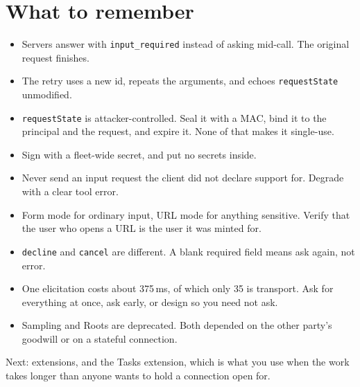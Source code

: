 \section{What to remember}

\begin{itemize}[leftmargin=1.6em, itemsep=3pt]
\item Servers answer with \texttt{input\_required} instead of asking mid-call.
The original request finishes.
\item The retry uses a new id, repeats the arguments, and echoes
\texttt{requestState} unmodified.
\item \texttt{requestState} is attacker-controlled. Seal it with a MAC, bind it
to the principal and the request, and expire it. None of that makes it
single-use.
\item Sign with a fleet-wide secret, and put no secrets inside.
\item Never send an input request the client did not declare support for.
Degrade with a clear tool error.
\item Form mode for ordinary input, URL mode for anything sensitive. Verify that
the user who opens a URL is the user it was minted for.
\item \texttt{decline} and \texttt{cancel} are different. A blank required field
means ask again, not error.
\item One elicitation costs about 375\,ms, of which only 35 is transport. Ask
for everything at once, ask early, or design so you need not ask.
\item Sampling and Roots are deprecated. Both depended on the other party's
goodwill or on a stateful connection.
\end{itemize}

Next: extensions, and the Tasks extension, which is what you use when the work
takes longer than anyone wants to hold a connection open for.
